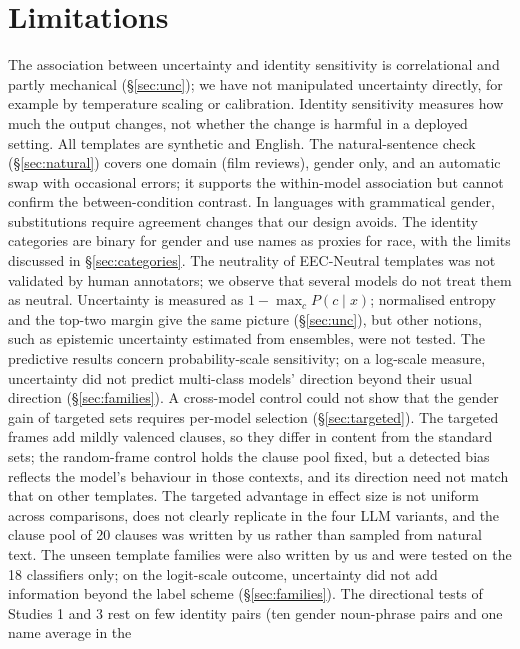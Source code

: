 \documentclass[runningheads]{llncs}
\begin{document}
\section{Limitations}
The association between uncertainty and identity sensitivity is correlational
and partly mechanical (\S\ref{sec:unc}); we have not manipulated uncertainty
directly, for example by temperature scaling or calibration. Identity
sensitivity measures how much the output changes, not whether the change is
harmful in a deployed setting. All templates are synthetic and English. The
natural-sentence check (\S\ref{sec:natural}) covers one domain (film reviews),
gender only, and an automatic swap with occasional errors; it supports the
within-model association but cannot confirm the between-condition contrast. In
languages with grammatical gender, substitutions require agreement changes that
our design avoids. The identity categories are binary for gender and use names
as proxies for race, with the limits discussed in \S\ref{sec:categories}. The neutrality of EEC-Neutral templates was not validated by human
annotators; we observe that several models do not treat them as neutral.
Uncertainty is measured as $1-\max_c P(c\mid x)$; normalised entropy and the
top-two margin give the same picture (\S\ref{sec:unc}), but other notions, such
as epistemic uncertainty estimated from ensembles, were not tested. The
predictive results concern probability-scale sensitivity; on a log-scale
measure, uncertainty did not predict multi-class models' direction beyond their
usual direction (\S\ref{sec:families}). A
cross-model control could not show that the gender gain of targeted sets
requires per-model selection (\S\ref{sec:targeted}). The targeted frames add mildly valenced clauses, so they
differ in content from the standard sets; the random-frame control holds the
clause pool fixed, but a detected bias reflects the model's behaviour in those
contexts, and its direction need not match that on other templates. The
targeted advantage in effect size is not uniform across comparisons, does not
clearly replicate in the four LLM variants, and the clause pool of 20 clauses
was written by us rather than sampled from natural text. The unseen template
families were also written by us and were tested on the 18 classifiers only; on
the logit-scale outcome, uncertainty did not add information beyond the label
scheme (\S\ref{sec:families}). The directional tests of Studies 1 and 3 rest on
few identity pairs (ten gender noun-phrase pairs and one name average in the
\end{document}
